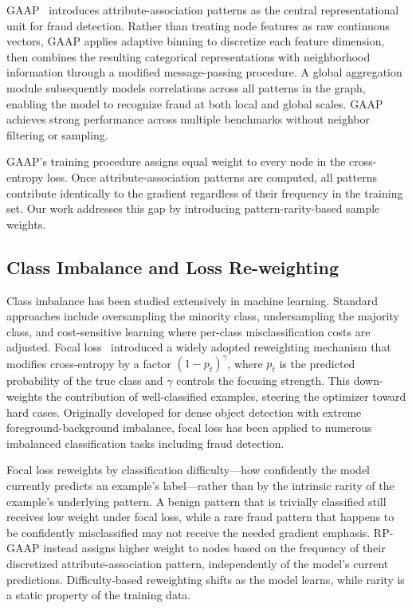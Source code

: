 GAAP~\cite{duan2025global} introduces attribute-association patterns as the central representational unit for fraud detection. Rather than treating node features as raw continuous vectors, GAAP applies adaptive binning to discretize each feature dimension, then combines the resulting categorical representations with neighborhood information through a modified message-passing procedure. A global aggregation module subsequently models correlations across all patterns in the graph, enabling the model to recognize fraud at both local and global scales. GAAP achieves strong performance across multiple benchmarks without neighbor filtering or sampling.

GAAP's training procedure assigns equal weight to every node in the cross-entropy loss. Once attribute-association patterns are computed, all patterns contribute identically to the gradient regardless of their frequency in the training set. Our work addresses this gap by introducing pattern-rarity-based sample weights.

\subsection{Class Imbalance and Loss Re-weighting}

Class imbalance has been studied extensively in machine learning. Standard approaches include oversampling the minority class, undersampling the majority class, and cost-sensitive learning where per-class misclassification costs are adjusted. Focal loss~\cite{lin2017focal} introduced a widely adopted reweighting mechanism that modifies cross-entropy by a factor $(1 - p_t)^\gamma$, where $p_t$ is the predicted probability of the true class and $\gamma$ controls the focusing strength. This down-weights the contribution of well-classified examples, steering the optimizer toward hard cases. Originally developed for dense object detection with extreme foreground-background imbalance, focal loss has been applied to numerous imbalanced classification tasks including fraud detection.

Focal loss reweights by classification difficulty---how confidently the model currently predicts an example's label---rather than by the intrinsic rarity of the example's underlying pattern. A benign pattern that is trivially classified still receives low weight under focal loss, while a rare fraud pattern that happens to be confidently misclassified may not receive the needed gradient emphasis. RP-GAAP instead assigns higher weight to nodes based on the frequency of their discretized attribute-association pattern, independently of the model's current predictions. Difficulty-based reweighting shifts as the model learns, while rarity is a static property of the training data.

